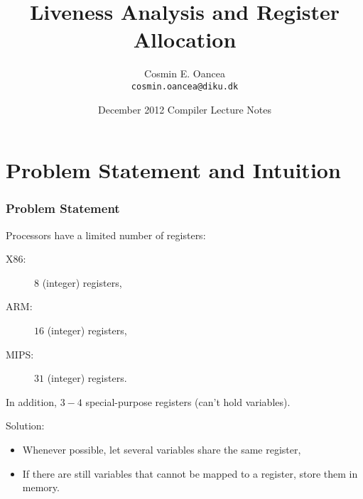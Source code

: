 \documentclass{beamer}
\title[Register Allocation]{Liveness Analysis and Register Allocation}
\author[C.~Oancea]{Cosmin E. Oancea\\{\tt cosmin.oancea@diku.dk}}
\institute{Department of Computer Science (DIKU)\\University of Copenhagen}
\date[December 2012]{December 2012 Compiler Lecture Notes}
\newcommand{\emp}[1]{\textcolor{DikuRed}{ #1}}
\begin{document}
\titleslide



\begin{frame}[fragile]
	\tableofcontents
\end{frame}

\section{Problem Statement and Intuition}

\begin{frame}[fragile,t]
   \frametitle{Problem Statement}

\bigskip


\emp{Processors have a limited number of registers:}

\bigskip

\begin{description}

    \item[X86:] $8$ (integer) registers,\bigskip

    \item[ARM:] $16$ (integer) registers,\bigskip

    \item[MIPS:] $31$ (integer) registers.\bigskip

\end{description}

In addition, $3-4$ special-purpose registers (can't hold variables).

\bigskip
\bigskip

\emp{Solution:}

\bigskip

\begin{itemize}

    \item Whenever possible, let several variables share the same register,\bigskip

    \item If there are still variables that cannot be mapped to a register,
            store them in memory.

\end{itemize}


\end{frame}
\end{document}
